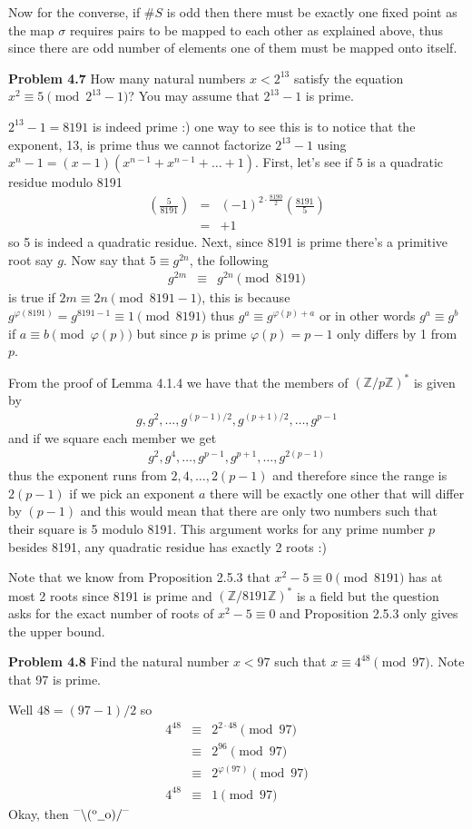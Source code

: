 \documentclass[aps,preprint,preprintnumbers,nofootinbib,showpacs,prd]{revtex4-1}
\newcommand{\nbea}{\begin{eqnarray*}}
\newcommand{\neea}{\end{eqnarray*}}
\newcommand{\dunno}{$ {}^{\mbox {--}}\backslash(^{\rm o}{}\underline{\hspace{0.2cm}}{\rm o})/^{\mbox {--}}$}
\begin{document}
Now for the converse, if $\#S$ is odd then there must be exactly one fixed point as the map $\sigma$ requires pairs to be mapped to each other as explained above, thus since there are odd number of elements one of them must be mapped onto itself.

{\bf Problem 4.7} How many natural numbers $x < 2^{13}$ satisfy the equation $x^2 \equiv 5 \pmod{2^{13}-1}$? You may assume that $2^{13} - 1$ is prime.

$2^{13}-1 = 8191$ is indeed prime :) one way to see this is to notice that the exponent, 13, is prime thus we cannot factorize $2^{13}-1$ using $x^n-1 = (x-1)(x^{n-1} + x^{n-1} + \dots + 1)$. First, let's see if $5$ is a quadratic residue modulo 8191
%
\nbea
\left ( \frac{5}{8191} \right ) & = & (-1)^{2\cdot\frac{8190}{2}} \left ( \frac{8191}{5} \right ) \\
& = & +1
\neea
%
so 5 is indeed a quadratic residue. Next, since 8191 is prime there's a primitive root say $g$. Now say that $5 \equiv g^{2n}$, the following
%
\nbea
g^{2m} & \equiv & g^{2n} \pmod{8191}
\neea
%
is true if $2m \equiv 2n \pmod{8191-1}$, this is because $g^{\varphi(8191)} = g^{8191-1} \equiv 1 \pmod{8191}$ thus $g^a \equiv g^{\varphi(p) + a}$ or in other words $g^a \equiv g^b$ if $a \equiv b \pmod{\varphi(p)}$ but since $p$ is prime $\varphi(p) = p-1$ only differs by 1 from $p$.

From the proof of Lemma 4.1.4 we have that the members of $(\mathbb{Z}/p\mathbb{Z})^*$ is given by
%
\nbea
g,g^2,\dots,g^{(p-1)/2},g^{(p+1)/2},\dots,g^{p-1}
\neea
%
and if we square each member we get
%
\nbea
g^2,g^4,\dots,g^{p-1},g^{p+1},\dots,g^{2(p-1)}
\neea
%
thus the exponent runs from $2, 4, \dots, 2(p-1)$ and therefore since the range is $2(p-1)$ if we pick an exponent $a$ there will be exactly one other that will differ by $(p-1)$ and this would mean that there are only two numbers such that their square is 5 modulo 8191. This argument works for any prime number $p$ besides 8191, any quadratic residue has exactly 2 roots :)

Note that we know from Proposition 2.5.3 that $x^2 - 5 \equiv 0 \pmod{8191}$ has at most 2 roots since 8191 is prime and $(\mathbb{Z}/8191\mathbb{Z})^*$ is a field but the question asks for the exact number of roots of $x^2 - 5 \equiv 0$ and Proposition 2.5.3 only gives the upper bound.

{\bf Problem 4.8} Find the natural number $x < 97$ such that $x \equiv 4^{48} \pmod {97}$. Note that 97 is prime.

Well $48 = (97-1)/2$ so
%
\nbea
4^{48} & \equiv & 2^{2\cdot 48}\pmod{97} \\
& \equiv & 2^{96} \pmod{97} \\
& \equiv & 2^{\varphi(97)} \pmod{97} \\
4^{48} & \equiv & 1 \pmod{97}
\neea
%
Okay, then \dunno
\end{document}
